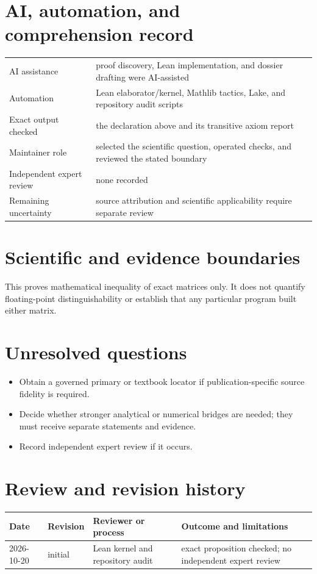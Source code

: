 \documentclass[11pt]{article}
\begin{document}
\section{AI, automation, and comprehension record}
\begin{tabularx}{\textwidth}{@{}lY@{}}\toprule
AI assistance & proof discovery, Lean implementation, and dossier drafting were AI-assisted \\
Automation & Lean elaborator/kernel, Mathlib tactics, Lake, and repository audit scripts \\
Exact output checked & the declaration above and its transitive axiom report \\
Maintainer role & selected the scientific question, operated checks, and reviewed the stated boundary \\
Independent expert review & none recorded \\
Remaining uncertainty & source attribution and scientific applicability require separate review \\
\bottomrule\end{tabularx}

\section{Scientific and evidence boundaries}
This proves mathematical inequality of exact matrices only. It does not quantify floating-point distinguishability or establish that any particular program built either matrix.

\section{Unresolved questions}
\begin{itemize}
\item Obtain a governed primary or textbook locator if publication-specific source fidelity is required.
\item Decide whether stronger analytical or numerical bridges are needed; they must receive separate statements and evidence.
\item Record independent expert review if it occurs.
\end{itemize}

\section{Review and revision history}
\begin{tabularx}{\textwidth}{@{}lllX@{}}\toprule
Date & Revision & Reviewer or process & Outcome and limitations \\
\midrule
2026-10-20 & initial & Lean kernel and repository audit & exact proposition checked; no independent expert review \\
\bottomrule\end{tabularx}
\end{document}

